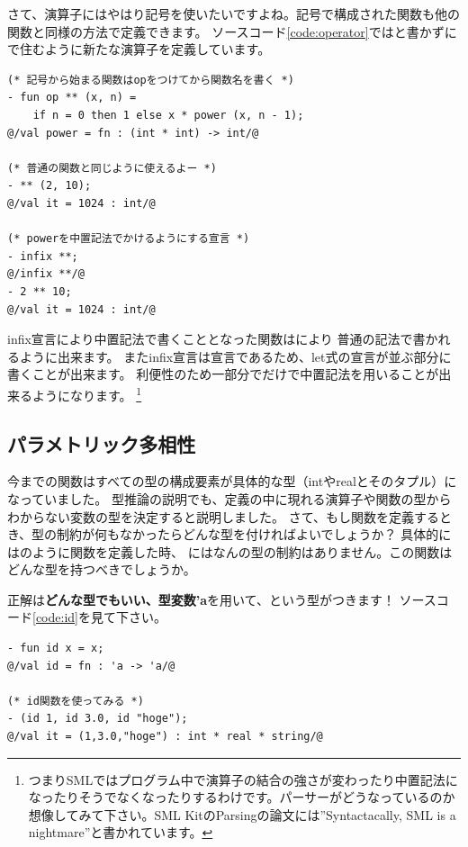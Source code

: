 \documentclass[11pt,a4paper]{jarticle}
\begin{document}
さて、演算子にはやはり記号を使いたいですよね。記号で構成された関数も他の関数と同様の方法で定義できます。
ソースコード\ref{code:operator}ではと書かずに
\prog{**}で住むように新たな演算子を定義しています。

\begin{lstlisting}[caption=演算子の定義,label=code:operator]
(* 記号から始まる関数はopをつけてから関数名を書く *)
- fun op ** (x, n) =
    if n = 0 then 1 else x * power (x, n - 1);
@/val power = fn : (int * int) -> int/@

(* 普通の関数と同じように使えるよー *)
- ** (2, 10);
@/val it = 1024 : int/@

(* powerを中置記法でかけるようにする宣言 *)
- infix **;
@/infix **/@
- 2 ** 10;
@/val it = 1024 : int/@
\end{lstlisting}

infix宣言により中置記法で書くこととなった関数はにより
普通の記法で書かれるように出来ます。
またinfix宣言は宣言であるため、let式の宣言が並ぶ部分に書くことが出来ます。
利便性のため一部分でだけで中置記法を用いることが出来るようになります。
\footnote{つまりSMLではプログラム中で演算子の結合の強さが変わったり中置記法になったりそうでなくなったりするわけです。パーサーがどうなっているのか想像してみて下さい。SML KitのParsingの論文には''Syntactacally, SML is a nightmare''\cite{SML-KIT}と書かれています。}

\subsection{パラメトリック多相性}

今までの関数はすべての型の構成要素が具体的な型（intやrealとそのタプル）になっていました。
型推論の説明でも、定義の中に現れる演算子や関数の型からわからない変数の型を決定すると説明しました。
さて、もし関数を定義するとき、型の制約が何もなかったらどんな型を付ければよいでしょうか？
具体的にはのように関数を定義した時、
にはなんの型の制約はありません。この関数はどんな型を持つべきでしょうか。

正解は{\bfseries どんな型でもいい、型変数'a}を用いて、という型がつきます！
ソースコード\ref{code:id}を見て下さい。

\begin{lstlisting}[caption=多相関数,label=code:id]
- fun id x = x;
@/val id = fn : 'a -> 'a/@

(* id関数を使ってみる *)
- (id 1, id 3.0, id "hoge");
@/val it = (1,3.0,"hoge") : int * real * string/@
\end{lstlisting}
\end{document}
